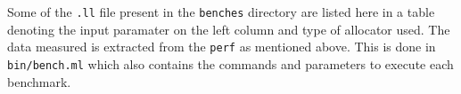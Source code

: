 \documentclass{article}
\begin{document}
Some of the \texttt{.ll} file present in the \texttt{benches} directory are listed here in a table denoting the input paramater on the left column and type of allocator used.
The data measured is extracted from the \texttt{perf} as mentioned above. This is done in \texttt{bin/bench.ml} which also contains the commands and parameters to execute each benchmark.



%










\end{document}
